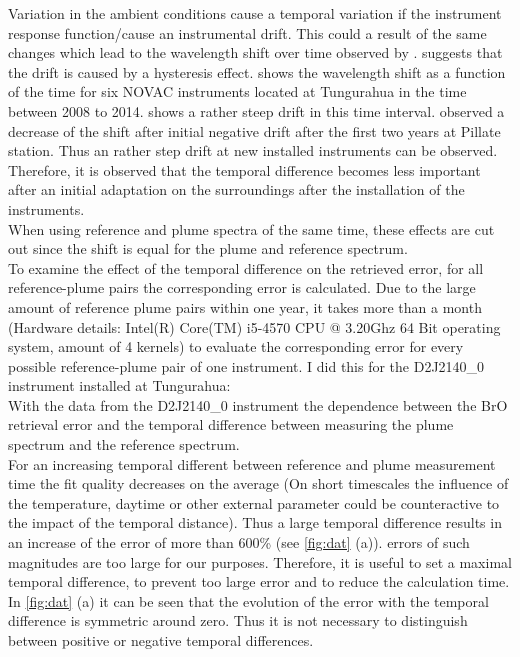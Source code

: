 Variation in the ambient conditions cause a temporal variation if the instrument response function/cause an instrumental drift. This could a result of the same changes which lead to the wavelength shift over time observed by \citet{WarnachSimon}.  \citet{WarnachSimon} suggests that the drift is caused by a hysteresis effect.  shows the wavelength shift as a function of the time for six NOVAC instruments located at Tungurahua in the time between 2008 to 2014.  shows a rather steep drift in this time interval.
\citet{WarnachSimon} observed a decrease of the shift after initial negative drift after the first two years at Pillate station. Thus an rather step drift at new installed instruments can be observed. Therefore, it is observed that the temporal difference becomes less important after an initial adaptation on the surroundings after the installation of the instruments.\\
When using reference and plume spectra of the same time, these effects are cut out since the shift is equal for the plume and reference spectrum.\\
To examine the effect of the temporal difference on the retrieved  error, for all reference-plume pairs the corresponding  error is calculated. Due to the large amount of reference plume pairs within one year, it takes more than a month (Hardware details: Intel(R) Core(TM) i5-4570 CPU @ 3.20Ghz 64 Bit operating system, amount of 4 kernels) to evaluate the corresponding  error for every possible reference-plume pair of one instrument. I did this for the  D2J2140\_0 instrument installed at Tungurahua:\\
With the data from the D2J2140\_0 instrument the dependence between the BrO retrieval error and the temporal difference between measuring the plume spectrum and the reference spectrum.\\
For an increasing temporal different between reference and plume measurement time the fit quality decreases on the average (On short timescales the influence of the temperature, daytime or other external parameter could be counteractive to the impact of the temporal distance). Thus a large temporal difference results in an increase of the   error of more than 600\% (see \cref{fig:dat} (a)).
 errors of such magnitudes are too large for our purposes. Therefore, it is useful to set a maximal temporal difference, to prevent too large  error and to reduce the calculation time.
%
In \cref{fig:dat} (a) it can be seen that the evolution of the   error with the temporal difference is symmetric around zero. Thus it is not necessary to distinguish between positive or negative temporal differences.
